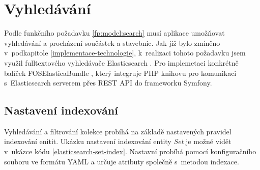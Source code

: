 \section{Vyhledávání}
Podle funkčního požadavku \ref{fp:model:search} musí aplikace umožňovat vyhledávání a procházení součástek a stavebnic. Jak již bylo zmíněno v~podkapitole \ref{implementace-technologie}, k~realizaci tohoto požadavku jsem využil fulltextového vyhledávače Elasticsearch \autocite{elasticsearch}. Pro implemetaci konkrétně balíček FOSElasticaBundle \autocite{foselastica}, který integruje PHP knihovu pro komunikaci s~Elasticsearch serverem přes \gls{REST} API do frameworku Symfony.


\subsection{Nastavení indexování}
Vyhledávání a filtrování kolekce probíhá na základě nastavených pravidel indexování enitit. Ukázku nastavení indexování entity \textit{Set} je 
možné vidět v~ukázce kódu \ref{elasticsearch-set-index}. Nastavní probíhá pomocí konfiguračního souboru ve formátu \gls{YAML} a určuje atributy společně s~metodou indexace.

